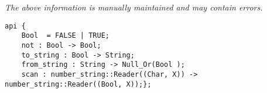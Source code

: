 \label{api:Bool}

{\tiny \it The above information is manually maintained and may contain errors.}
\begin{verbatim}
api {
    Bool  = FALSE | TRUE;
    not : Bool -> Bool;
    to_string : Bool -> String;
    from_string : String -> Null_Or(Bool );
    scan : number_string::Reader((Char, X)) -> number_string::Reader((Bool, X));};
\end{verbatim}
